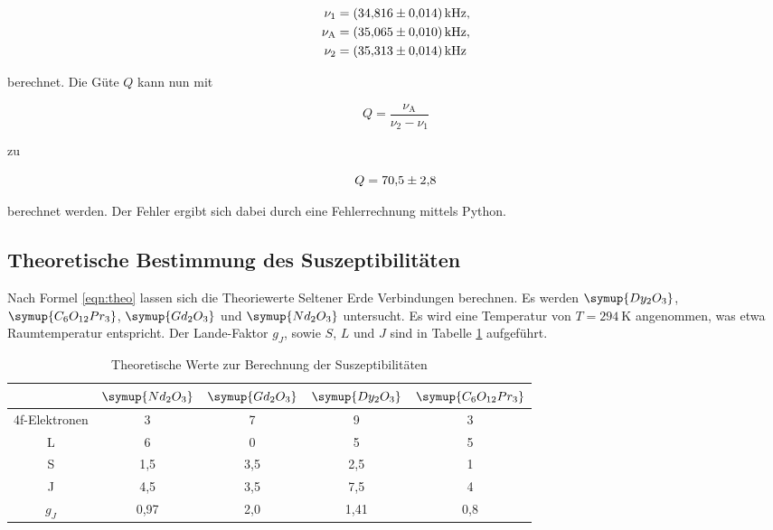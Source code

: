 \begin{align*}
\nu_1 &= \SI{34.816+-0.014}{\kilo\hertz},\\
\nu_\text{A} &= \SI{35.065+-0.010}{\kilo\hertz},\\
\nu_2 &= \SI{35.313+-0.014}{\kilo\hertz}
\end{align*}

berechnet. Die Güte $Q$ kann nun mit 

\begin{equation*}
Q = \frac{\nu_\text{A}}{\nu_2 - \nu_1}
\end{equation*}

zu 

\begin{equation*}
Q = \num{70.5+-2.8}
\end{equation*}

berechnet werden.
Der Fehler ergibt sich dabei durch eine Fehlerrechnung mittels 
Python.

\subsection{Theoretische Bestimmung des Suszeptibilitäten}

Nach Formel \eqref{eqn:theo} lassen sich die Theoriewerte Seltener 
Erde Verbindungen berechnen. Es werden $\symup{Dy_2O_3}$, $\symup{C_6O_{12}Pr_3}$, 
$\symup{Gd_2O_3}$ und $\symup{Nd_2O_3}$ untersucht. Es wird eine Temperatur von 
$T = \SI{294}{\kelvin}$ angenommen, was etwa Raumtemperatur entspricht.
Der Lande-Faktor $g_J$, sowie $S$, $L$ und $J$ sind in Tabelle \ref{tab:theo} 
aufgeführt.

\begin{table}
\centering
\caption{Theoretische Werte zur Berechnung der Suszeptibilitäten}
\label{tab:theo}
\begin{tabular}{c c c c c}
\toprule
& $\symup{Nd_2O_3}$ & $\symup{Gd_2O_3}$ & $\symup{Dy_2O_3}$ & $\symup{C_6O_{12}Pr_3}$\\
\midrule
4f-Elektronen & 3    & 7   & 9    & 3\\
L             & 6    & 0   & 5    & 5\\
S             & 1,5  & 3,5 & 2,5  & 1\\
J             & 4,5  & 3,5 & 7,5  & 4\\
$g_J$         & 0,97 & 2,0 & 1,41 & 0,8\\
\bottomrule
\end{tabular}
\end{table}

